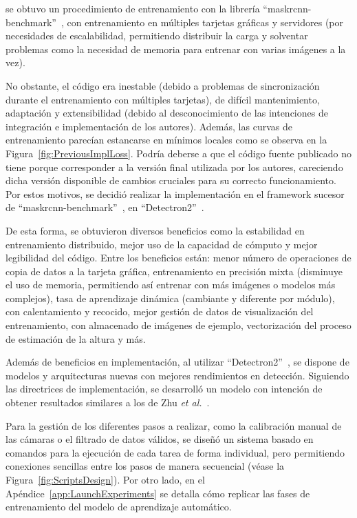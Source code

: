 se obtuvo un procedimiento de entrenamiento con la librería ``maskrcnn-benchmark''~\cite{MaskRCNN}, con
entrenamiento en múltiples tarjetas gráficas y servidores (por necesidades de escalabilidad,
permitiendo distribuir la carga y solventar problemas como la necesidad de memoria para entrenar con varias
imágenes a la vez).
\par
No obstante, el código era inestable (debido a problemas de sincronización durante el entrenamiento con múltiples tarjetas),
de difícil mantenimiento, adaptación y extensibilidad (debido al desconocimiento de las
intenciones de integración e implementación de los autores). Además, las curvas de entrenamiento
parecían estancarse en mínimos locales como se observa en la Figura~\ref{fig:PreviousImplLoss}.
Podría deberse a que el código fuente publicado no tiene porque corresponder a la versión final
utilizada por los autores, careciendo dicha versión disponible de cambios cruciales para su correcto funcionamiento.
Por estos motivos, se decidió realizar
la implementación en el framework sucesor de ``maskrcnn-benchmark''~\cite{MaskRCNN}, en ``Detectron2''~\cite{detectron2}.
\par
De esta forma, se obtuvieron diversos beneficios como la estabilidad en entrenamiento distribuido, mejor uso de la
capacidad de cómputo y mejor legibilidad del código. Entre los beneficios están:
menor número de operaciones de copia de datos a la tarjeta gráfica,
entrenamiento en precisión mixta (disminuye el uso de memoria, permitiendo así entrenar con más imágenes o modelos más complejos),
tasa de aprendizaje dinámica (cambiante y diferente por módulo), con calentamiento y recocido,
mejor gestión de datos de visualización del entrenamiento, con almacenado de imágenes de ejemplo,
vectorización del proceso de estimación de la altura y más.
\par
Además de beneficios en implementación, al utilizar ``Detectron2''~\cite{detectron2}, se dispone
de modelos y arquitecturas nuevas con mejores rendimientos en detección. Siguiendo las
directrices de implementación, se desarrolló un modelo con intención de
obtener resultados similares a los de Zhu \emph{et al.}~\cite{SVMIW}.
\par
Para la gestión de los diferentes pasos a realizar, como la calibración manual de las cámaras o el filtrado de datos válidos,
se diseñó un sistema basado en comandos para la ejecución de cada tarea de forma individual, pero permitiendo conexiones sencillas
entre los pasos de manera secuencial (véase la Figura~\ref{fig:ScriptsDesign}).
Por otro lado, en el Apéndice~\ref{app:LaunchExperiments} se detalla
cómo replicar las fases de entrenamiento del modelo de aprendizaje automático.

